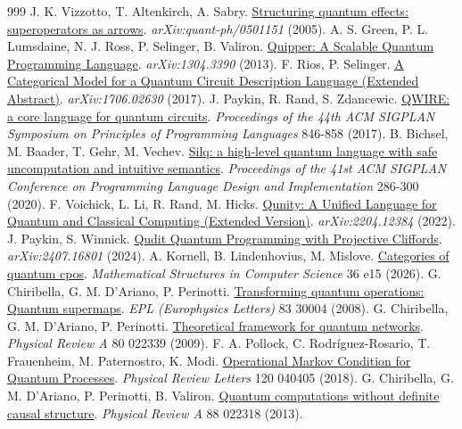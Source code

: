 \begin{thebibliography}{999}
 J. K. Vizzotto, T. Altenkirch, A. Sabry. \href{https://arxiv.org/abs/quant-ph/0501151}{Structuring quantum effects: superoperators as arrows}. \emph{arXiv:quant-ph/0501151}  (2005).
 A. S. Green, P. L. Lumsdaine, N. J. Ross, P. Selinger, B. Valiron. \href{https://arxiv.org/abs/1304.3390}{Quipper: A Scalable Quantum Programming Language}. \emph{arXiv:1304.3390}  (2013).
 F. Rios, P. Selinger. \href{https://arxiv.org/abs/1706.02630}{A Categorical Model for a Quantum Circuit Description Language (Extended Abstract)}. \emph{arXiv:1706.02630}  (2017).
 J. Paykin, R. Rand, S. Zdancewic. \href{https://doi.org/10.1145/3009837.3009894}{QWIRE: a core language for quantum circuits}. \emph{Proceedings of the 44th ACM SIGPLAN Symposium on Principles of Programming Languages} 846-858 (2017).
 B. Bichsel, M. Baader, T. Gehr, M. Vechev. \href{https://doi.org/10.1145/3385412.3386007}{Silq: a high-level quantum language with safe uncomputation and intuitive semantics}. \emph{Proceedings of the 41st ACM SIGPLAN Conference on Programming Language Design and Implementation} 286-300 (2020).
 F. Voichick, L. Li, R. Rand, M. Hicks. \href{https://arxiv.org/abs/2204.12384}{Qunity: A Unified Language for Quantum and Classical Computing (Extended Version)}. \emph{arXiv:2204.12384}  (2022).
 J. Paykin, S. Winnick. \href{https://arxiv.org/abs/2407.16801}{Qudit Quantum Programming with Projective Cliffords}. \emph{arXiv:2407.16801}  (2024).
 A. Kornell, B. Lindenhovius, M. Mislove. \href{https://doi.org/10.1017/S096012952610053X}{Categories of quantum cpos}. \emph{Mathematical Structures in Computer Science} 36 e15 (2026).
 G. Chiribella, G. M. D'Ariano, P. Perinotti. \href{https://doi.org/10.1209/0295-5075/83/30004}{Transforming quantum operations: Quantum supermaps}. \emph{EPL (Europhysics Letters)} 83 30004 (2008).
 G. Chiribella, G. M. D'Ariano, P. Perinotti. \href{https://doi.org/10.1103/PhysRevA.80.022339}{Theoretical framework for quantum networks}. \emph{Physical Review A} 80 022339 (2009).
 F. A. Pollock, C. Rodríguez-Rosario, T. Frauenheim, M. Paternostro, K. Modi. \href{https://doi.org/10.1103/PhysRevLett.120.040405}{Operational Markov Condition for Quantum Processes}. \emph{Physical Review Letters} 120 040405 (2018).
 G. Chiribella, G. M. D'Ariano, P. Perinotti, B. Valiron. \href{https://doi.org/10.1103/PhysRevA.88.022318}{Quantum computations without definite causal structure}. \emph{Physical Review A} 88 022318 (2013).

\end{thebibliography}
